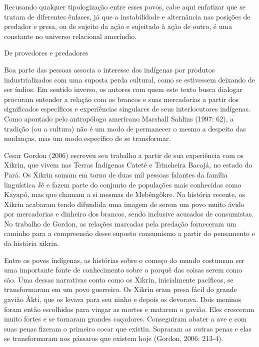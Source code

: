 \documentclass{article}
\begin{document}
Recusando qualquer tipologiza\c{c}\~ao entre esses povos, cabe aqui
enfatizar que se tratam de diferentes \^enfases, j\'a que a
instabilidade e altern\^ancia nas posi\c{c}\~oes de predador e presa,
ou de sujeito da a\c{c}\~ao e sujeitado \`a a\c{c}\~ao de outro, \'e
uma constante no universo relacional amer\'indio. 

De provedores e predadores 

Boa parte das pessoas associa o interesse dos ind\'igenas por produtos
industrializados com uma suposta perda cultural, como se estivessem
deixando de ser \'indios. Em sentido inverso, os autores com quem este
texto busca dialogar procuram entender a rela\c{c}\~ao com os brancos e
suas mercadorias a partir dos significados espec\'ificos e
experi\^encias singulares de seus interlocutores ind\'igenas. Como
apontado pelo antrop\'ologo americano Marshall Sahlins (1997: 62), a
tradi\c{c}\~ao (ou a cultura) n\~ao \'e um modo de permanecer o mesmo a
despeito das mudan\c{c}as, mas um modo espec\'ifico de se transformar.

Cesar Gordon (2006) escreveu seu trabalho a partir de sua experi\^encia
com os Xikrin, que vivem nas Terras Ind\'igenas Catet\'e e Trincheira
Bacaj\'a, no estado do Par\'a. Os Xikrin somam em torno de duas mil
pessoas falantes da fam\'ilia lingu\'istica J\^e e fazem parte do
conjunto de popula\c{c}\~oes mais conhecidas como Kayap\'o, mas que
chamam a si mesmas de Meb\^eng\^okre. Na hist\'oria recente, os Xikrin
acabaram tendo difundida uma imagem de serem um povo muito \'avido por
mercadorias e dinheiro dos brancos, sendo inclusive acusados de
consumistas. No trabalho de Gordon, as rela\c{c}\~oes marcadas pela
preda\c{c}\~ao forneceram um caminho para a compreens\~ao desse suposto
consumismo a partir do pensamento e da hist\'oria xikrin.

Entre os povos ind\'igenas, as hist\'orias sobre o come\c{c}o do mundo
costumam ser uma importante fonte de conhecimento sobre o porqu\^e das
coisas serem como s\~ao. Uma dessas narrativas conta como os Xikrin,
inicialmente pac\'ificos, se transformaram em um povo guerreiro. Os
Xikrin eram presa f\'acil do grande gavi\~ao \`Akti, que os levava para
seu ninho e depois os devorava. Dois meninos foram ent\~ao escolhidos
para vingar as mortes e matarem o gavi\~ao. Eles cresceram muito fortes
e se tornaram grandes ca\c{c}adores. Conseguiram abater a ave e com
suas penas fizeram o primeiro cocar que existiu. Sopraram as outras
penas e elas se transformaram nos p\'assaros que existem hoje (Gordon,
2006: 213-4). 
\end{document}
